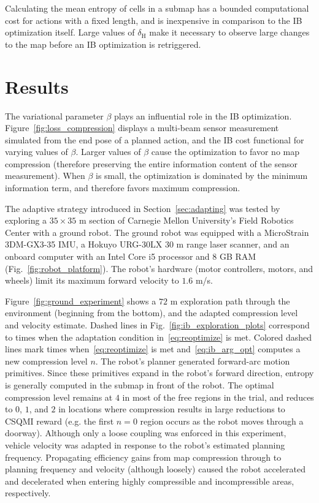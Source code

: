 Calculating the mean entropy of cells in a submap has a bounded computational
cost for actions with a fixed length, and is inexpensive in comparison to the IB
optimization itself. Large values of $\delta_{\text{H}}$ make it necessary to observe
large changes to the map before an IB optimization is retriggered.

\section{Results}

The variational parameter $\beta$ plays an influential role in the IB
optimization. Figure~\ref{fig:loss_compression} displays a multi-beam
sensor measurement simulated from the end pose of a planned action, and the IB cost
functional for varying values of $\beta$. Larger values of $\beta$ cause the
optimization to favor no map compression (therefore preserving the entire
information content of the sensor measurement). When $\beta$ is small, the
optimization is dominated by the minimum information term, and therefore favors
maximum compression.

The adaptive strategy introduced in Section~\ref{sec:adapting} was tested by
exploring a $35\times35$ m section of Carnegie Mellon University's Field Robotics
Center with a ground robot. The ground robot was equipped with a MicroStrain 3DM-GX3-35 IMU,
a Hokuyo URG-30LX $30$ m range laser scanner, and an onboard computer with an Intel Core i5
processor and 8 GB RAM (Fig.~\ref{fig:robot_platform}). The robot's hardware (motor controllers,
motors, and wheels) limit its maximum forward velocity to $1.6$ m/s.

Figure~\ref{fig:ground_experiment} shows a $72$ m
exploration path through the environment (beginning from the bottom), and the
adapted compression level and velocity estimate. Dashed lines in
Fig.~\ref{fig:ib_exploration_plots} correspond to times when the adaptation condition
in~\eqref{eq:reoptimize} is met. Colored dashed lines mark times
when~\eqref{eq:reoptimize} is met and~\eqref{eq:ib_arg_opt} computes a new
compression level $n$. The robot's planner generated forward-arc motion
primitives. Since these primitives expand in the robot's
forward direction, entropy is generally computed in the submap in front of
the robot. The optimal compression level remains at $4$ in most of the free regions
in the trial, and reduces to $0$, $1$, and $2$ in locations where compression results
in large reductions to CSQMI reward (e.g. the first $n=0$ region occurs as the robot
moves through a doorway). Although only a loose coupling was enforced in this experiment,
vehicle velocity was adapted in response to the robot's estimated planning frequency.
Propagating efficiency gains from map compression through to planning frequency
and velocity (although loosely) caused the robot accelerated and decelerated when entering highly
compressible and incompressible areas, respectively.

